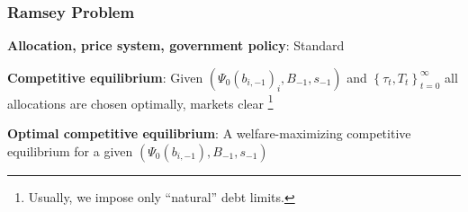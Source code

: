 \documentclass{beamer}
\begin{document}
\begin{frame}
 \frametitle{Ramsey Problem}

\begin{definition}
\textbf{Allocation, price system, government policy}: Standard

\end{definition}

\begin{definition}
\textbf{Competitive equilibrium}: Given $\left( \Psi_0(b_{i,-1})
_{i},B_{-1},s_{-1}\right) $ and $\left\{ \tau _{t},T_{t}\right\} _{t=0}^{\infty }$
all allocations are chosen optimally, markets clear \footnote{Usually, we impose only  ``natural'' debt limits. }
\end{definition}

\begin{definition}
\textbf{Optimal competitive equilibrium}: A welfare-maximizing competitive
equilibrium for a given $\left( \Psi_0(b_{i,-1}),B_{-1},s_{-1}\right) $
\end{definition}

 \end{frame}

% 
%
\end{document}
